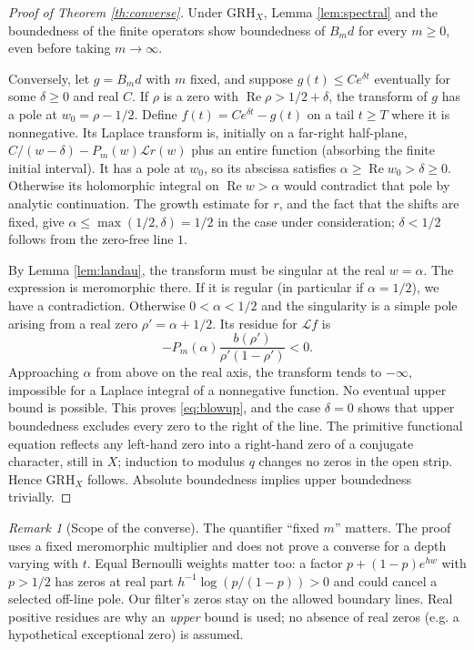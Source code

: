 \documentclass[11pt]{article}
\theoremstyle{remark}\newtheorem{remark}[theorem]{Remark}
\newcommand{\Rea}{\operatorname{Re}}
\newcommand{\GRH}{\mathrm{GRH}}
\begin{document}
\begin{proof}[Proof of Theorem \ref{th:converse}]
Under $\GRH_X$, Lemma \ref{lem:spectral} and the boundedness of the finite operators show boundedness of $B_m d$ for every $m\ge0$, even before taking $m\to\infty$.

Conversely, let $g=B_m d$ with $m$ fixed, and suppose $g(t)\le C e^{\delta t}$ eventually for some $\delta\ge0$ and real $C$. If $\rho$ is a zero with $\Rea\rho>1/2+\delta$, the transform of $g$ has a pole at $w_0=\rho-1/2$. Define $f(t)=Ce^{\delta t}-g(t)$ on a tail $t\ge T$ where it is nonnegative. Its Laplace transform is, initially on a far-right half-plane, $C/(w-\delta)-P_m(w)\mathcal Lr(w)$ plus an entire function (absorbing the finite initial interval). It has a pole at $w_0$, so its abscissa satisfies $\alpha\ge\Rea w_0>\delta\ge0$. Otherwise its holomorphic integral on $\Rea w>\alpha$ would contradict that pole by analytic continuation. The growth estimate for $r$, and the fact that the shifts are fixed, give $\alpha\le\max(1/2,\delta)=1/2$ in the case under consideration; $\delta<1/2$ follows from the zero-free line $1$.

By Lemma \ref{lem:landau}, the transform must be singular at the real $w=\alpha$. The expression is meromorphic there. If it is regular (in particular if $\alpha=1/2$), we have a contradiction. Otherwise $0<\alpha<1/2$ and the singularity is a simple pole arising from a real zero $\rho'=\alpha+1/2$. Its residue for $\mathcal Lf$ is
\[
 -P_m(\alpha)\frac{b(\rho')}{\rho'(1-\rho')}<0.
\]
Approaching $\alpha$ from above on the real axis, the transform tends to $-\infty$, impossible for a Laplace integral of a nonnegative function. No eventual upper bound is possible. This proves \eqref{eq:blowup}, and the case $\delta=0$ shows that upper boundedness excludes every zero to the right of the line. The primitive functional equation reflects any left-hand zero into a right-hand zero of a conjugate character, still in $X$; induction to modulus $q$ changes no zeros in the open strip. Hence $\GRH_X$ follows. Absolute boundedness implies upper boundedness trivially.
\end{proof}

\begin{remark}[Scope of the converse]
The quantifier ``fixed $m$'' matters. The proof uses a fixed meromorphic multiplier and does not prove a converse for a depth varying with $t$. Equal Bernoulli weights matter too: a factor $p+(1-p)e^{hw}$ with $p>1/2$ has zeros at real part $h^{-1}\log(p/(1-p))>0$ and could cancel a selected off-line pole. Our filter's zeros stay on the allowed boundary lines. Real positive residues are why an \emph{upper} bound is used; no absence of real zeros (e.g. a hypothetical exceptional zero) is assumed.
\end{remark}
\end{document}
